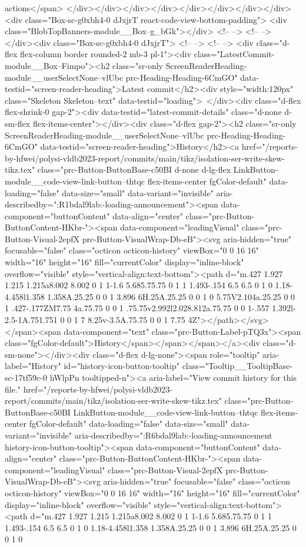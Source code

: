 {{{{{{{{{{{{{{{{{{{{{{{{{{{{{actions</span> </div></div></div></div></div></div></div></div><div class="Box-sc-g0xbh4-0 dJxjrT react-code-view-bottom-padding"> <div class="BlobTopBanners-module__Box--g_bGk"></div> <!-- --> <!-- --> </div><div class="Box-sc-g0xbh4-0 dJxjrT"> <!-- --> <!-- --> <div class="d-flex flex-column border rounded-2 mb-3 pl-1"><div class="LatestCommit-module__Box--Fimpo"><h2 class="sr-only ScreenReaderHeading-module__userSelectNone--vlUbc prc-Heading-Heading-6CmGO" data-testid="screen-reader-heading">Latest commit</h2><div style="width:120px" class="Skeleton Skeleton--text" data-testid="loading"> </div><div class="d-flex flex-shrink-0 gap-2"><div data-testid="latest-commit-details" class="d-none d-sm-flex flex-items-center"></div><div class="d-flex gap-2"><h2 class="sr-only ScreenReaderHeading-module__userSelectNone--vlUbc prc-Heading-Heading-6CmGO" data-testid="screen-reader-heading">History</h2><a href="/reports-by-hfwei/polysi-vldb2023-report/commits/main/tikz/isolation-ser-write-skew-tikz.tex" class="prc-Button-ButtonBase-c50BI d-none d-lg-flex LinkButton-module__code-view-link-button--thtqc flex-items-center fgColor-default" data-loading="false" data-size="small" data-variant="invisible" aria-describedby=":R1bdal9lab:-loading-announcement"><span data-component="buttonContent" data-align="center" class="prc-Button-ButtonContent-HKbr-"><span data-component="leadingVisual" class="prc-Button-Visual-2epfX prc-Button-VisualWrap-Db-eB"><svg aria-hidden="true" focusable="false" class="octicon octicon-history" viewBox="0 0 16 16" width="16" height="16" fill="currentColor" display="inline-block" overflow="visible" style="vertical-align:text-bottom"><path d="m.427 1.927 1.215 1.215a8.002 8.002 0 1 1-1.6 5.685.75.75 0 1 1 1.493-.154 6.5 6.5 0 1 0 1.18-4.458l1.358 1.358A.25.25 0 0 1 3.896 6H.25A.25.25 0 0 1 0 5.75V2.104a.25.25 0 0 1 .427-.177ZM7.75 4a.75.75 0 0 1 .75.75v2.992l2.028.812a.75.75 0 0 1-.557 1.392l-2.5-1A.751.751 0 0 1 7 8.25v-3.5A.75.75 0 0 1 7.75 4Z"></path></svg></span><span data-component="text" class="prc-Button-Label-pTQ3x"><span class="fgColor-default">History</span></span></span></a><div class="d-sm-none"></div><div class="d-flex d-lg-none"><span role="tooltip" aria-label="History" id="history-icon-button-tooltip" class="Tooltip__TooltipBase-sc-17tf59c-0 hWlpPn tooltipped-n"><a aria-label="View commit history for this file." href="/reports-by-hfwei/polysi-vldb2023-report/commits/main/tikz/isolation-ser-write-skew-tikz.tex" class="prc-Button-ButtonBase-c50BI LinkButton-module__code-view-link-button--thtqc flex-items-center fgColor-default" data-loading="false" data-size="small" data-variant="invisible" aria-describedby=":R6bdal9lab:-loading-announcement history-icon-button-tooltip"><span data-component="buttonContent" data-align="center" class="prc-Button-ButtonContent-HKbr-"><span data-component="leadingVisual" class="prc-Button-Visual-2epfX prc-Button-VisualWrap-Db-eB"><svg aria-hidden="true" focusable="false" class="octicon octicon-history" viewBox="0 0 16 16" width="16" height="16" fill="currentColor" display="inline-block" overflow="visible" style="vertical-align:text-bottom"><path d="m.427 1.927 1.215 1.215a8.002 8.002 0 1 1-1.6 5.685.75.75 0 1 1 1.493-.154 6.5 6.5 0 1 0 1.18-4.458l1.358 1.358A.25.25 0 0 1 3.896 6H.25A.25.25 0 0 1 0 }}}}}}}}}}}}}}}}}}}}}}}}}}}}}
